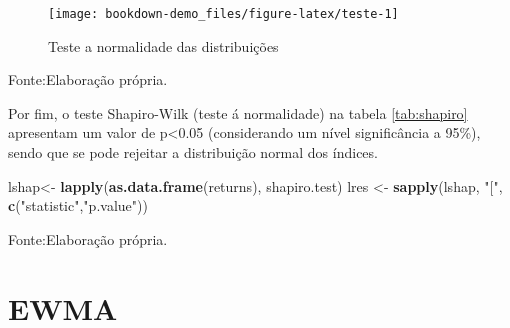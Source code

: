 \documentclass[
  12pt,
  a4paper,
  openany]{book}
\newenvironment{Shaded}{\begin{snugshade}}{\end{snugshade}}
\newcommand{\KeywordTok}[1]{\textcolor[rgb]{0.13,0.29,0.53}{\textbf{#1}}}
\newcommand{\NormalTok}[1]{#1}
\newcommand{\StringTok}[1]{\textcolor[rgb]{0.31,0.60,0.02}{#1}}
\begin{document}
\begin{figure}

{\centering \texttt{[image: bookdown-demo\_files/figure-latex/teste-1]} 

}

\caption{Teste a normalidade das distribuições}\label{fig:teste}
\end{figure}
\FloatBarrier
\centering

Fonte:Elaboração própria.

\justifying
\bigskip

Por fim, o teste Shapiro-Wilk (teste á normalidade) na tabela \ref{tab:shapiro} apresentam um valor de p\textless0.05 (considerando um nível significância a 95\%), sendo que se pode rejeitar a distribuição normal dos índices.

\scriptsize

\begin{Shaded}
\begin{Highlighting}[]
\NormalTok{lshap\textless{}{-}}\StringTok{ }\KeywordTok{lapply}\NormalTok{(}\KeywordTok{as.data.frame}\NormalTok{(returns), shapiro.test)}
\NormalTok{lres \textless{}{-}}\StringTok{ }\KeywordTok{sapply}\NormalTok{(lshap, }\StringTok{"["}\NormalTok{, }\KeywordTok{c}\NormalTok{(}\StringTok{"statistic"}\NormalTok{,}\StringTok{"p.value"}\NormalTok{))}
\end{Highlighting}
\end{Shaded}

\normalsize

\begin{table}[!h]

\caption{\label{tab:shapiro}Teste normalidade Shapiro-Wilk}
\centering
{}
\end{table}
\FloatBarrier
\centering

Fonte:Elaboração própria.

\justifying
\bigskip

\newpage

\hypertarget{ewma}{%
\section{EWMA}\label{ewma}}
\end{document}
